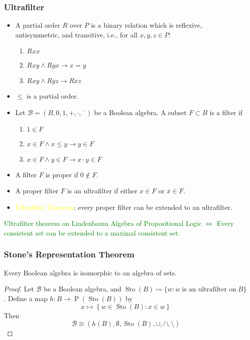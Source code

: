 \documentclass[UTF8,aspectratio=43,11pt,colorlinks,compress,openany]{beamer}%
\begin{document}
\begin{frame}\frametitle{Ultrafilter}
	\begin{itemize}
		\item A partial order $R$ over $P$ is a binary relation which is reflexive, antisymmetric, and transitive, i.e., for all $x,y,z\in P$:
		\begin{enumerate}
			\item $Rxx$
			\item $Rxy\wedge Ryx\to x=y$
			\item $Rxy\wedge Ryz\to	Rxz$
		\end{enumerate}
		\item $\leq$ is a partial order.
		\item Let $\mathcal{B}=(B,0,1,+,\cdot,\overline{\phantom{x}})$ be a Boolean algebra. A subset $F\subset B$ is a filter if
		\begin{enumerate}
			\item $1\in F$
			\item $x\in F\wedge x\leq y\to y\in F$
			\item $x\in F\wedge y\in F\to x\cdot y\in F$
		\end{enumerate}
		\item A filter $F$ is proper if $0\notin F$.
		\item A proper filter $F$ is an ultrafilter if either $x\in F$ or $\overline{x}\in F$.
		\item \textcolor{yellow}{Ultrafilter Theorem}: every proper filter can be extended to an ultrafilter.
	\end{itemize}
	\centering\textcolor{green}{Ultrafilter theorem on Lindenbaum Algebra of Propositional Logic $\iff$ Every consistent set can be extended to a maximal consistent set.}
\end{frame}

\begin{frame}\frametitle{Stone's Representation Theorem}
	\begin{theorem}
		Every Boolean algebra is isomorphic to an algebra of sets.
	\end{theorem}
	\begin{proof}
		Let $\mathcal{B}$ be a Boolean algebra, and $\operatorname{Sto}(B)\coloneqq \{w: w\;\text{is an ultrafilter on}\;B\}$. Define a map $h: B\to \operatorname{P}\left(\operatorname{Sto}(B)\right)$ by
		\[x\mapsto\left\{w\in\operatorname{Sto}(B): x\in w\right\}\] Then
		\[\mathcal{B}\cong\left(h(B),\emptyset,\operatorname{Sto}(B),\cup,\cap,\setminus\right)\]
	\end{proof}
\end{frame}
\end{document}
